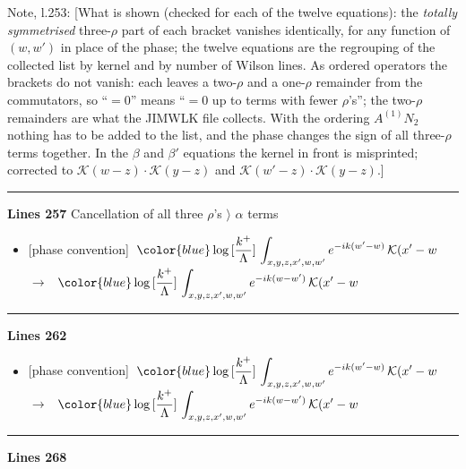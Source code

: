 \documentclass[10pt]{article}
\newenvironment{notebox}{\def\FrameCommand{{\color{notebar}\vrule width 1.5pt}\hspace{6pt}}\MakeFramed{\advance\hsize-\width\FrameRestore}\small}{\endMakeFramed}
\begin{document}
\begin{notebox}\textsf{\small Note, l.253:} [What is shown (checked for each of the twelve equations): the \emph{totally symmetrised} three-$\rho$ part of each bracket vanishes identically, for any function of $(w,w')$ in place of the phase; the twelve equations are the regrouping of the collected list by kernel and by number of Wilson lines. As ordered operators the brackets do not vanish: each leaves a two-$\rho$ and a one-$\rho$ remainder from the commutators, so ``$=0$'' means ``$=0$ up to terms with fewer $\rho$'s''; the two-$\rho$ remainders are what the JIMWLK file collects. With the ordering $A^{(1)}N_{2}$ nothing has to be added to the list, and the phase changes the sign of all three-$\rho$ terms together. In the $\beta$ and $\beta'$ equations the kernel in front is misprinted; corrected to $\mathcal{K}(w-z)\cdot\mathcal{K}(y-z)$ and $\mathcal{K}(w'-z)\cdot\mathcal{K}(y-z)$.]\end{notebox}
\noindent\rule{\linewidth}{0.3pt}\par\noindent\textbf{Lines 257} \quad \textsf{Cancellation of all three $\rho$'s $\rangle$ $\alpha$ terms} \par
\begin{itemize}[leftmargin=2.2em,itemsep=1pt,topsep=2pt]
\item[\textbf{l.257}] \textsf{\small [phase convention]} $\displaystyle \,{\color{blue}\log{[\frac{k^{+}}{\Lambda}]}}\,\int_{x,y,z,x',w,w'}e^{-ik(w'-w)}\,\mathcal{K}(x'-w$\ $\longrightarrow$\ $\displaystyle \,{\color{blue}\log{[\frac{k^{+}}{\Lambda}]}}\,\int_{x,y,z,x',w,w'}e^{-ik(w-w')}\,\mathcal{K}(x'-w$
\end{itemize}
\noindent\rule{\linewidth}{0.3pt}\par\noindent\textbf{Lines 262} \par
\begin{itemize}[leftmargin=2.2em,itemsep=1pt,topsep=2pt]
\item[\textbf{l.262}] \textsf{\small [phase convention]} $\displaystyle \,{\color{blue}\log{[\frac{k^{+}}{\Lambda}]}}\,\int_{x,y,z,x',w,w'}e^{-ik(w'-w)}\,\mathcal{K}(x'-w$\ $\longrightarrow$\ $\displaystyle \,{\color{blue}\log{[\frac{k^{+}}{\Lambda}]}}\,\int_{x,y,z,x',w,w'}e^{-ik(w-w')}\,\mathcal{K}(x'-w$
\end{itemize}
\noindent\rule{\linewidth}{0.3pt}\par\noindent\textbf{Lines 268} \par
\end{document}
